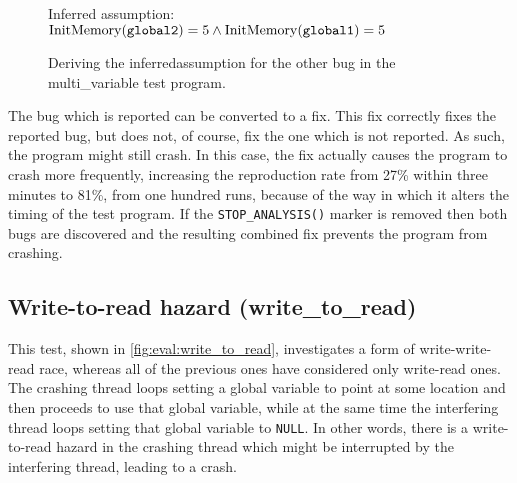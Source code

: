 \begin{figure}
  \hfill
  \hfill
  \hfill
  \vspace{12pt}
  \centerline{Inferred assumption: $\mathrm{InitMemory}(\texttt{global2}) = 5 \wedge \mathrm{InitMemory}(\texttt{global1}) = 5$}
  \caption{Deriving the \gls{inferredassumption} for the other bug in
    the multi\_variable test program.}
  \label{fig:eval:multi_variable:other_bug}
\end{figure}

The bug which is reported can be converted to a fix.  This fix
correctly fixes the reported bug, but does not, of course, fix the one
which is not reported.  As such, the program might still crash.  In
this case, the fix actually causes the program to crash more
frequently, increasing the reproduction rate from 27\% within three
minutes to 81\%, from one hundred runs, because of the way in which it
alters the timing of the test program.  If the
\texttt{STOP\_ANALYSIS()} marker is removed then both bugs are
discovered and the resulting combined fix prevents the program from
crashing.

\subsection{Write-to-read hazard (write\_to\_read)}

This test, shown in \autoref{fig:eval:write_to_read}, investigates a
form of write-write-read race, whereas all of the previous ones have
considered only write-read ones.  The crashing thread loops setting a
global variable to point at some location and then proceeds to use
that global variable, while at the same time the interfering thread
loops setting that global variable to \texttt{NULL}.  In other words,
there is a write-to-read hazard in the crashing thread which might be
interrupted by the interfering thread, leading to a crash.


